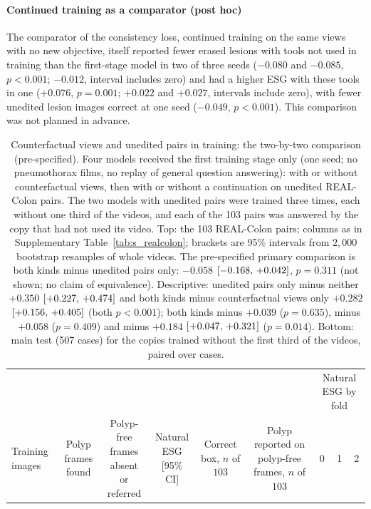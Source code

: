 \paragraph{Continued training as a comparator (post hoc)} The comparator of the consistency loss, continued training on the same views with no new objective, itself reported fewer erased lesions with tools not used in training than the first-stage model in two of three seeds ($-0.080$ and $-0.085$, $p < 0.001$; $-0.012$, interval includes zero) and had a higher ESG with these tools in one ($+0.076$, $p = 0.001$; $+0.022$ and $+0.027$, intervals include zero), with fewer unedited lesion images correct at one seed ($-0.049$, $p < 0.001$). This comparison was not planned in advance.

\begin{table}[!htbp]
\caption{Counterfactual views and unedited pairs in training: the two-by-two comparison (pre-specified). Four models received the first training stage only (one seed; no pneumothorax films, no replay of general question answering): with or without counterfactual views, then with or without a continuation on unedited REAL-Colon pairs. The two models with unedited pairs were trained three times, each without one third of the videos, and each of the 103 pairs was answered by the copy that had not used its video. Top: the 103 REAL-Colon pairs; columns as in Supplementary Table~\ref{tab:s_realcolon}; brackets are 95\% intervals from $2{,}000$ bootstrap resamples of whole videos. The pre-specified primary comparison is both kinds minus unedited pairs only: $-0.058$ $[-0.168,\,+0.042]$, $p = 0.311$ (not shown; no claim of equivalence). Descriptive: unedited pairs only minus neither $+0.350$ $[+0.227,\,+0.474]$ and both kinds minus counterfactual views only $+0.282$ $[+0.156,\,+0.405]$ (both $p < 0.001$); both kinds minus \gem{} $+0.039$ ($p = 0.635$), minus \opus{} $+0.058$ ($p = 0.409$) and minus \gpt{} $+0.184$ $[+0.047,\,+0.321]$ ($p = 0.014$). Bottom: main test (507 cases) for the copies trained without the first third of the videos, paired over cases.}
\label{tab:s_twobytwo}
\centering
\footnotesize
\begin{adjustbox}{max width=\linewidth}
\begin{tabular}{l cc c cc ccc}
\toprule
 & & & & & & \multicolumn{3}{c}{Natural ESG by fold} \\
\cmidrule(lr){7-9}
Training images & \shortstack{Polyp frames\\found} & \shortstack{Polyp-free frames\\absent or referred} & \shortstack{Natural ESG\\{}[95\% CI]} & \shortstack{Correct box,\\$n$ of $103$} & \shortstack{Polyp reported on\\polyp-free frames, $n$ of $103$} & 0 & 1 & 2 \\

\end{tabular}
\end{adjustbox}
\end{table}
